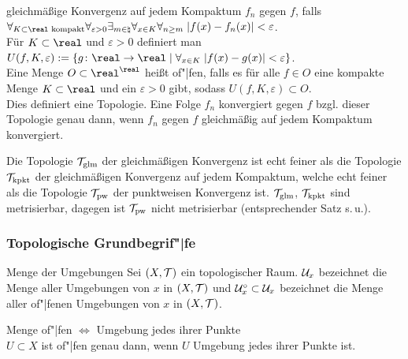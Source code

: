 \begin{Def}{gleichmäßige Konvergenz auf jedem Kompaktum}
    $f_n$  gegen $f$,
    falls $\forall_{K \subset \real \text{ kompakt}} \forall_{\varepsilon > 0}
    \exists_{m \in \natural} \forall_{x \in K} \forall_{n \ge m}\;
    |f(x) - f_n(x)| < \varepsilon$. \\
    Für $K \subset \real$ und $\varepsilon > 0$ definiert man
    $U(f, K, \varepsilon) := \{g\colon \real \rightarrow \real \;|\;
    \forall_{x \in K}\; |f(x) - g(x)| < \varepsilon\}$. \\
    Eine Menge $O \subset \real^\real$ heißt of"|fen, falls es für alle
    $f \in O$ eine kompakte Menge $K \subset \real$ und ein $\varepsilon > 0$
    gibt, sodass $U(f, K, \varepsilon) \subset O$. \\
    Dies definiert eine Topologie.
    Eine Folge $f_n$ konvergiert gegen $f$ bzgl. dieser Topologie genau dann,
    wenn $f_n$ gegen $f$ gleichmäßig auf jedem Kompaktum konvergiert.
\end{Def}

\linie

\begin{Bem}
    Die Topologie $\mathcal{T}_{\text{glm}}$ der gleichmäßigen Konvergenz ist echt feiner
    als die Topologie $\mathcal{T}_{\text{kpkt}}$ der gleichmäßigen Konvergenz auf jedem
    Kompaktum, welche echt feiner als die Topologie $\mathcal{T}_{\text{pw}}$ der
    punktweisen Konvergenz ist.
    $\mathcal{T}_{\text{glm}}$, $\mathcal{T}_{\text{kpkt}}$ sind metrisierbar, dagegen ist
    $\mathcal{T}_{\text{pw}}$ nicht metrisierbar (entsprechender Satz s.\,u.).
\end{Bem}

\pagebreak

\subsubsection{%
    Topologische Grundbegrif"|fe%
}

\begin{Def}{Menge der Umgebungen}
    Sei $(X, \mathcal{T})$ ein topologischer Raum.
    $\mathcal{U}_x$ bezeichnet die Menge aller Umgebungen von $x$ in $(X, \mathcal{T})$ und
    $\mathcal{U}_x^\circ \subset \mathcal{U}_x$ bezeichnet die Menge aller of"|fenen Umgebungen
    von $x$ in $(X, \mathcal{T})$.
\end{Def}

\begin{Lemma}{Menge of"|fen $\Leftrightarrow$ Umgebung jedes ihrer Punkte}\\
    $U \subset X$ ist of"|fen genau dann, wenn $U$ Umgebung jedes ihrer
    Punkte ist.
\end{Lemma}

